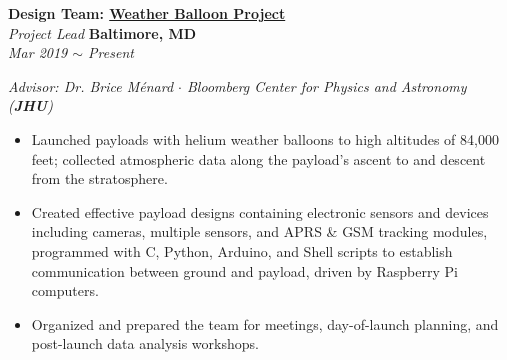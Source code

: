 \documentclass[10pt, letterpaper]{article}
\begin{document}
\begin{paracol}{2}
	\textbf{Design Team: \href{https://nearspace.jhu.edu/}{Weather Balloon Project}}\\
	\textit{Project Lead}
	\switchcolumn
	\raggedleft\textbf{Baltimore, MD}\\
	\raggedleft\textit{Mar 2019 $\sim$ Present}
\end{paracol}\vspace{-1mm}
\textit{Advisor: Dr. Brice Ménard $\cdot$ Bloomberg Center for Physics and Astronomy (\textbf{JHU})}
\vspace{-2mm}
\begin{itemize}
	\item  Launched payloads with helium weather balloons to high altitudes of 84,000
	feet; collected atmospheric data along the payload's ascent to and descent from the 
	stratosphere.\vspace{-3mm}
	\item Created effective payload designs containing electronic sensors and devices including
	cameras, multiple sensors, and APRS \& GSM tracking modules, programmed with C, Python, 
	Arduino, and Shell scripts to establish communication between ground and payload,
	driven by Raspberry Pi computers.\vspace{-3mm}
	\item Organized and prepared the team for meetings, day-of-launch planning,
	and post-launch data analysis workshops.
\end{itemize}
\vspace{-2mm}
\end{document}

